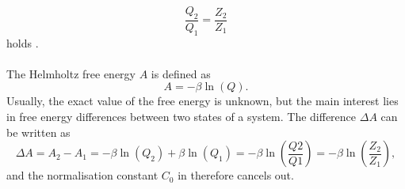 \begin{equation}
\frac{Q_2}{Q_1} = \frac{Z_2}{Z_1}
\end{equation}
holds \autocite[17]{freeEnergyBook}.\\
\\
The Helmholtz free energy $A$ is defined as
\begin{equation}
	A = - \beta \ln\left(Q\right).
\end{equation}
Usually, the exact value of the free energy is unknown, but the main interest lies in free energy differences between two states of a system. The difference $\Delta A$ can be written as
\begin{equation}
\Delta A = A_2 - A_1 = - \beta \ln\left(Q_2\right) + \beta \ln\left(Q_1\right) = -\beta \ln\left(\frac{Q2}{Q1}\right) = -\beta \ln \left(\frac{Z_2}{Z_1}\right),
\end{equation}
and the normalisation constant $C_0$ in  therefore cancels out.
